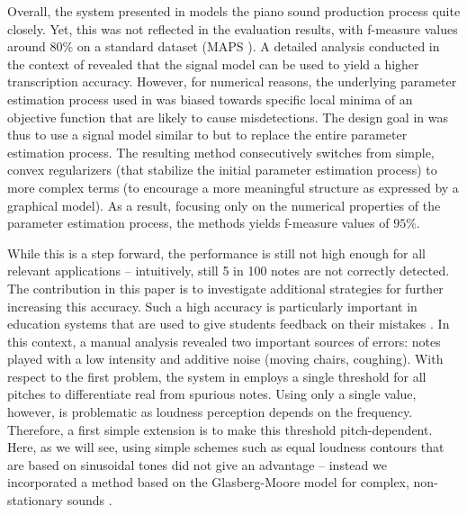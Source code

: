 \documentclass{article}
\begin{document}
Overall, the system presented in \cite{EwertPS15_DPNMD_ICASSP} models the piano sound production process quite closely. Yet, this was not reflected in the evaluation results, with f-measure values around $80$\% on a standard dataset (MAPS \cite{EmiyaBD10_MultipitchEstimation_TASLP}).
A detailed analysis conducted in the context of \cite{EwertS16_PianoTranscriptionADMM_TASLP} revealed that the signal model can be used to yield a  higher transcription accuracy. However, for numerical reasons, the underlying parameter estimation process used in \cite{EwertPS15_DPNMD_ICASSP} was biased towards
specific local minima of an objective function that are likely to cause misdetections.
The design goal in \cite{EwertS16_PianoTranscriptionADMM_TASLP} was thus to use a signal model similar to \cite{EwertPS15_DPNMD_ICASSP} but to replace the entire parameter estimation process. The resulting method consecutively switches from simple, convex regularizers (that stabilize the initial parameter estimation process) to more complex terms (to encourage a more meaningful structure as expressed by a graphical model). As a result, focusing only on the numerical properties of the parameter estimation process, the methods yields f-measure values of $95$\%.

While this is a step forward, the performance is still not high enough for all relevant applications -- intuitively, still 5 in 100 notes are not correctly detected. The contribution in this paper is to investigate additional strategies for further increasing this accuracy. Such a high accuracy is particularly important in education systems that are used to give students feedback on their mistakes \cite{BenetosKD12_ScoreInformedAMT_EUSIPCO,EwertWMS16_ScoreDeviation_ISMIR}. In this context, a manual analysis revealed two important sources of errors: notes played with a low intensity and additive noise (moving chairs, coughing).
With respect to the first problem, the system in \cite{EwertS16_PianoTranscriptionADMM_TASLP} employs a single threshold for all pitches to differentiate real from spurious notes. Using only a single value, however, is problematic as loudness perception depends on the frequency. Therefore, a first simple extension is to make this threshold pitch-dependent. Here, as we will see, using simple schemes such as equal loudness contours that are based on sinusoidal tones did not give an advantage -- instead we incorporated a method based on the Glasberg-Moore model for complex, non-stationary sounds \cite{GlasbergM2002_ModelLoudnessTimeVarying_JAES}.
\end{document}
